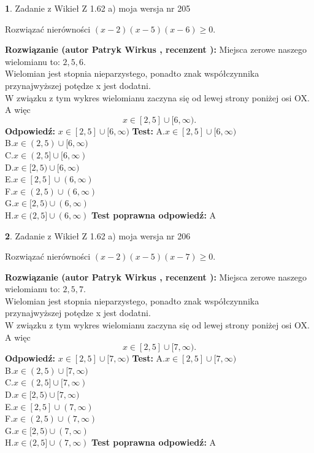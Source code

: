 \documentclass[12pt, a4paper]{article}
\theoremstyle{definition} %
\newtheorem{zad}{}
\newcommand{\zadStart}[1]{\begin{zad}#1\newline}
\newcommand{\zadStop}{\end{zad}}
\newcommand{\rozwStart}[2]{\noindent \textbf{Rozwiązanie (autor #1 , recenzent #2): }\newline}
\newcommand{\rozwStop}{\newline}
\newcommand{\odpStart}{\noindent \textbf{Odpowiedź:}\newline}
\newcommand{\odpStop}{\newline}
\newcommand{\testStart}{\noindent \textbf{Test:}\newline}
\newcommand{\testStop}{\newline}
\newcommand{\kluczStart}{\noindent \textbf{Test poprawna odpowiedź:}\newline}
\newcommand{\kluczStop}{\newline}
\begin{document}
\zadStart{Zadanie z Wikieł Z 1.62 a) moja wersja nr 205}

Rozwiązać nierówności $(x-2)(x-5)(x-6)\ge0$.
\zadStop
\rozwStart{Patryk Wirkus}{}
Miejsca zerowe naszego wielomianu to: $2, 5, 6$.\\
Wielomian jest stopnia nieparzystego, ponadto znak współczynnika przy\linebreak najwyższej potędze x jest dodatni.\\ W związku z tym wykres wielomianu zaczyna się od lewej strony poniżej osi OX. A więc $$x \in [2,5] \cup [6,\infty).$$
\rozwStop
\odpStart
$x \in [2,5] \cup [6,\infty)$
\odpStop
\testStart
A.$x \in [2,5] \cup [6,\infty)$\\
B.$x \in (2,5) \cup [6,\infty)$\\
C.$x \in (2,5] \cup [6,\infty)$\\
D.$x \in [2,5) \cup [6,\infty)$\\
E.$x \in [2,5] \cup (6,\infty)$\\
F.$x \in (2,5) \cup (6,\infty)$\\
G.$x \in [2,5) \cup (6,\infty)$\\
H.$x \in (2,5] \cup (6,\infty)$
\testStop
\kluczStart
A
\kluczStop



\zadStart{Zadanie z Wikieł Z 1.62 a) moja wersja nr 206}

Rozwiązać nierówności $(x-2)(x-5)(x-7)\ge0$.
\zadStop
\rozwStart{Patryk Wirkus}{}
Miejsca zerowe naszego wielomianu to: $2, 5, 7$.\\
Wielomian jest stopnia nieparzystego, ponadto znak współczynnika przy\linebreak najwyższej potędze x jest dodatni.\\ W związku z tym wykres wielomianu zaczyna się od lewej strony poniżej osi OX. A więc $$x \in [2,5] \cup [7,\infty).$$
\rozwStop
\odpStart
$x \in [2,5] \cup [7,\infty)$
\odpStop
\testStart
A.$x \in [2,5] \cup [7,\infty)$\\
B.$x \in (2,5) \cup [7,\infty)$\\
C.$x \in (2,5] \cup [7,\infty)$\\
D.$x \in [2,5) \cup [7,\infty)$\\
E.$x \in [2,5] \cup (7,\infty)$\\
F.$x \in (2,5) \cup (7,\infty)$\\
G.$x \in [2,5) \cup (7,\infty)$\\
H.$x \in (2,5] \cup (7,\infty)$
\testStop
\kluczStart
A
\kluczStop
\end{document}
